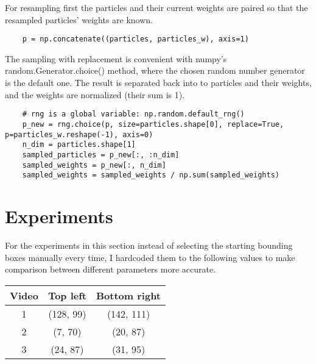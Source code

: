 \documentclass[10pt,a4paper,twoside]{article}
\begin{document}
For resampling first the particles and their current weights are paired so that
the resampled particles' weights are known.
\begin{verbatim}
    p = np.concatenate((particles, particles_w), axis=1)
\end{verbatim}
The sampling with replacement is convenient with numpy's random.Generator.choice() method, where the
chosen random number generator is the default one. The result is separated back into to particles
and their weights, and the weights are normalized (their sum is 1).
\begin{verbatim}
    # rng is a global variable: np.random.default_rng()
    p_new = rng.choice(p, size=particles.shape[0], replace=True, p=particles_w.reshape(-1), axis=0)
    n_dim = particles.shape[1]
    sampled_particles = p_new[:, :n_dim]
    sampled_weights = p_new[:, n_dim]
    sampled_weights = sampled_weights / np.sum(sampled_weights)
\end{verbatim}

\section{Experiments}

For the experiments in this section instead of selecting the starting bounding boxes
manually every time, I hardcoded them to the following values to make comparison
between different parameters more accurate.
\begin{table}[h!]
\begin{center}
    \begin{tabular}{ c c c } 
     \hline
     Video & Top left & Bottom right\\
     \hline
     \hline
     1 & (128, 99)& (142, 111)\\ 
     \hline
     2 & (7, 70)&(20, 87)\\
     \hline
     3 & (24, 87)&(31, 95)\\
     \hline
    \end{tabular}
\end{center}
\end{table}    

\end{document}
